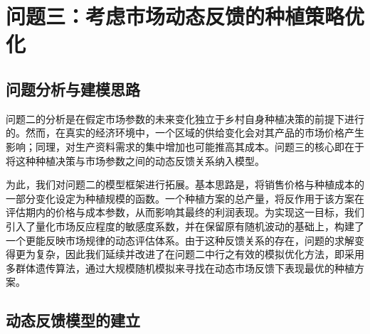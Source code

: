 \section{问题三：考虑市场动态反馈的种植策略优化}

\subsection{问题分析与建模思路}
问题二的分析是在假定市场参数的未来变化独立于乡村自身种植决策的前提下进行的。然而，在真实的经济环境中，一个区域的供给变化会对其产品的市场价格产生影响；同理，对生产资料需求的集中增加也可能推高其成本。问题三的核心即在于将这种种植决策与市场参数之间的动态反馈关系纳入模型。

为此，我们对问题二的模型框架进行拓展。基本思路是，将销售价格与种植成本的一部分变化设定为种植规模的函数。一个种植方案的总产量，将反作用于该方案在评估期内的价格与成本参数，从而影响其最终的利润表现。为实现这一目标，我们引入了量化市场反应程度的敏感度系数，并在保留原有随机波动的基础上，构建了一个更能反映市场规律的动态评估体系。由于这种反馈关系的存在，问题的求解变得更为复杂，因此我们延续并改进了在问题二中行之有效的模拟优化方法，即采用多群体遗传算法，通过大规模随机模拟来寻找在动态市场反馈下表现最优的种植方案。

\subsection{动态反馈模型的建立}

